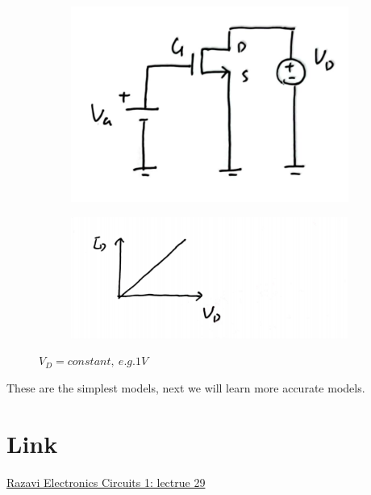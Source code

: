 \documentclass[fontset=windows]{article}
\begin{document}
\begin{figure}[ht]
    \centering
    \begin{subfigure}[b]{0.3\textwidth}
        \centering
        \includegraphics[width=\textwidth]{8.jpg}
        \label{fig:subfig3}
    \end{subfigure}
    \hfill
    \begin{subfigure}[b]{0.45\textwidth}
        \centering
        \includegraphics[width=\textwidth]{9.jpg}
        \label{fig:subfig4}
    \end{subfigure}
    \captionsetup{labelformat=empty}
    \caption{$V_D=constant, \ e.g. 1V$}
    \label{fig:both2}
\end{figure}

These are the simplest models, next we will learn more accurate models.

\section*{Link}

\href{https://www.bilibili.com/video/BV1FD4y1R7Ah?p=29&vd_source=1d0c07486a3bd3b0adb8ac548bf6453e}{Razavi Electronics Circuits 1: lectrue 29}
\end{document}
